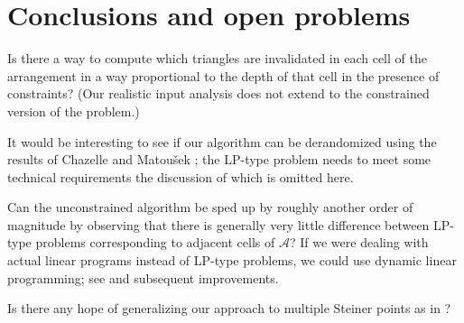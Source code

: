 \documentclass{cccg13}
\newcommand\arr{\mathcal A}
\begin{document}
\section{Conclusions and open problems}\label{sec:concl}
Is there a way to compute which triangles are invalidated in each cell of the arrangement in a way proportional to the depth of that cell in the presence of constraints?  (Our realistic input analysis does not extend to the constrained version of the problem.)

It would be interesting to see if our algorithm can be derandomized using the results of Chazelle and Matou\v sek \cite{derand}; the LP-type problem needs to meet some technical requirements the discussion of which is omitted here.

Can the unconstrained algorithm be sped up by roughly another order of magnitude by observing that there is generally very little difference between LP-type problems corresponding to adjacent cells of $\arr$?  If we were dealing with actual linear programs instead of LP-type problems, we could use dynamic linear programming; see \cite{dynamic} and subsequent improvements.

Is there any hope of generalizing our approach to multiple Steiner points as in \cite{orig}?
\end{document}
